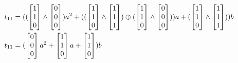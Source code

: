 \begin{equation*}
\begin{split}
        t_{11} &= ((\begin{bmatrix} 1\\ 1\\ 0 \end{bmatrix} \wedge \begin{bmatrix} 0\\ 0\\ 0 \end{bmatrix})a^2 + ((\begin{bmatrix} 1\\ 1\\ 0 \end{bmatrix} \wedge \begin{bmatrix} 1\\ 1\\ 1 \end{bmatrix}) \xor (\begin{bmatrix} 1\\ 1\\ 0 \end{bmatrix} \wedge \begin{bmatrix} 0\\ 0\\ 0 \end{bmatrix}))a + (\begin{bmatrix} 1\\ 1\\ 0 \end{bmatrix} \wedge \begin{bmatrix} 1\\ 1\\ 1 \end{bmatrix}))b\\
        t_{11} &= (\begin{bmatrix} 0\\ 0\\ 0 \end{bmatrix}a^2 + \begin{bmatrix} 1\\ 1\\ 0 \end{bmatrix}a + \begin{bmatrix} 1\\ 1\\ 0 \end{bmatrix})b\\

\end{split}
\end{equation*}

